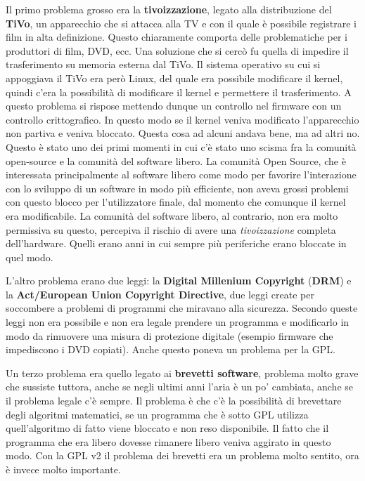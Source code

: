 Il primo problema grosso era la \textbf{tivoizzazione}, legato alla distribuzione del \textbf{TiVo}, un apparecchio che si attacca alla TV e con il quale è possibile registrare i film in alta definizione. Questo chiaramente comporta delle problematiche per i produttori di film, DVD, ecc. Una soluzione che si cercò fu quella di impedire il trasferimento su memoria esterna dal TiVo. Il sistema operativo su cui si appoggiava il TiVo era però Linux, del quale era possibile modificare il kernel, quindi c'era la possibilità di modificare il kernel e permettere il trasferimento.
 A questo problema si rispose mettendo dunque un controllo nel firmware con un controllo crittografico. In questo modo se il kernel veniva modificato l'apparecchio non partiva e veniva bloccato. Questa cosa ad alcuni andava bene, ma ad altri no. Questo è stato uno dei primi momenti in cui c'è stato uno scisma fra la comunità open-source e la comunità del software libero. La comunità Open Source, che è interessata principalmente al software libero come modo per favorire l'interazione con lo sviluppo di un software in modo più efficiente, non aveva grossi problemi con questo blocco per l'utilizzatore finale, dal momento che comunque il kernel era modificabile. 
 La comunità del software libero, al contrario, non era molto permissiva su questo, percepiva il rischio di avere una \textit{tivoizzazione} completa dell'hardware. Quelli erano anni in cui sempre più periferiche erano bloccate in quel modo.

L'altro problema erano due leggi: la \textbf{Digital Millenium Copyright} (\textbf{DRM}) e la \textbf{Act/European Union Copyright Directive}, due leggi create per soccombere a problemi di programmi che miravano alla sicurezza. Secondo queste leggi non era possibile e non era legale prendere un programma e modificarlo in modo da rimuovere una misura di protezione digitale (esempio firmware che impediscono i DVD copiati). Anche questo poneva un problema per la GPL.

Un terzo problema era quello legato ai \textbf{brevetti software}, problema molto grave che sussiste tuttora, anche se negli ultimi anni l'aria è un po' cambiata, anche se il problema legale c'è sempre. Il problema è che c'è la possibilità di brevettare degli algoritmi matematici, se un programma che è sotto GPL utilizza quell'algoritmo di fatto viene bloccato e non reso disponibile. Il fatto che il programma che era libero dovesse rimanere libero veniva aggirato in questo modo. Con la GPL v2 il problema dei brevetti era un problema molto sentito, ora è invece molto importante. 

